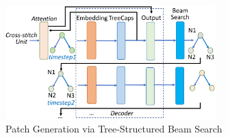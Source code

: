 





\begin{figure}[t]
	\centering
	\includegraphics[width=3.2in]{graphs/beam-search.png}
	\caption{Patch Generation via Tree-Structured Beam Search}
	\label{fig:patch-gen}
\end{figure}
